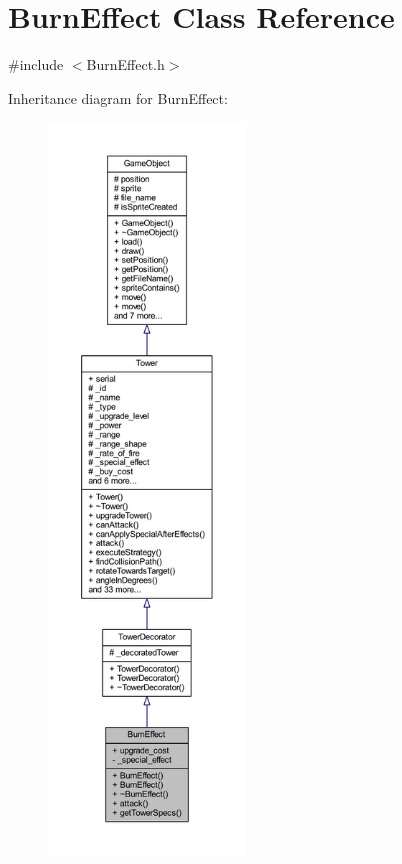 \hypertarget{class_burn_effect}{\section{Burn\+Effect Class Reference}
\label{class_burn_effect}
}


{\ttfamily \#include $<$Burn\+Effect.\+h$>$}



Inheritance diagram for Burn\+Effect\+:
\nopagebreak
\begin{figure}[H]
\begin{center}
\leavevmode
\includegraphics[height=550pt]{class_burn_effect__inherit__graph}
\end{center}
\end{figure}


